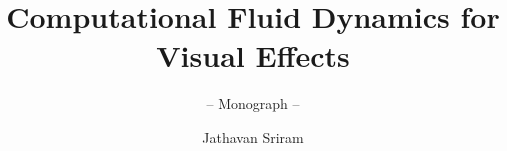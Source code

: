\documentclass[graybox,envcountchap,thebibliography]{../styles/svmono}
\begin{document}
\author{Jathavan Sriram}
\title{Computational Fluid Dynamics for Visual Effects}
\subtitle{-- Monograph --}
\maketitle

\frontmatter%






\tableofcontents




\mainmatter%













%

\backmatter%


\printindex

\end{document}
